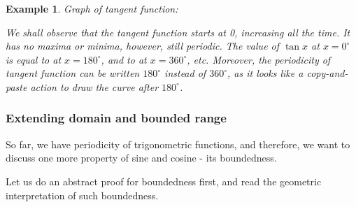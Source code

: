 \documentclass[12pt]{article}
\newtheorem*{example}{Example}
\begin{document}
    \begin{example}
        Graph of tangent function:

        \begin{center}
        \end{center}

        We shall observe that the tangent function starts at 0, increasing all the time. It has no maxima or minima, however, still periodic. The value of $\tan{x}$ at $x=0^\circ$ is equal to at $x=180^\circ$, and to at $x=360^\circ$, etc. Moreover, the periodicity of tangent function can be written $180^\circ$ instead of $360^\circ$, as it looks like a copy-and-paste action to draw the curve after $180^\circ$.
    \end{example}

    \subsubsection*{Extending domain and bounded range}

    So far, we have periodicity of trigonometric functions, and therefore, we want to discuss one more property of sine and cosine - its boundedness.

    Let us do an abstract proof for boundedness first, and read the geometric interpretation of such boundedness.
\end{document}
